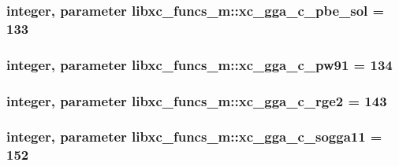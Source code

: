 \hypertarget{classlibxc__funcs__m_a44f75482ea324f5a50539ffdfb35b6f7}{
\subsubsection[{xc\-\_\-gga\-\_\-c\-\_\-pbe\-\_\-sol}]{\setlength{\rightskip}{0pt plus 5cm}integer, parameter libxc\-\_\-funcs\-\_\-m\-::xc\-\_\-gga\-\_\-c\-\_\-pbe\-\_\-sol = 133}}\label{classlibxc__funcs__m_a44f75482ea324f5a50539ffdfb35b6f7}
\hypertarget{classlibxc__funcs__m_af20bd6ced898ed4f4c011dad03298494}{
\subsubsection[{xc\-\_\-gga\-\_\-c\-\_\-pw91}]{\setlength{\rightskip}{0pt plus 5cm}integer, parameter libxc\-\_\-funcs\-\_\-m\-::xc\-\_\-gga\-\_\-c\-\_\-pw91 = 134}}\label{classlibxc__funcs__m_af20bd6ced898ed4f4c011dad03298494}
\hypertarget{classlibxc__funcs__m_abcb3cbd06df71def9e61bd0d466231d1}{
\subsubsection[{xc\-\_\-gga\-\_\-c\-\_\-rge2}]{\setlength{\rightskip}{0pt plus 5cm}integer, parameter libxc\-\_\-funcs\-\_\-m\-::xc\-\_\-gga\-\_\-c\-\_\-rge2 = 143}}\label{classlibxc__funcs__m_abcb3cbd06df71def9e61bd0d466231d1}
\hypertarget{classlibxc__funcs__m_a3bd4db90757fc2c20940b19d3680eee6}{
\subsubsection[{xc\-\_\-gga\-\_\-c\-\_\-sogga11}]{\setlength{\rightskip}{0pt plus 5cm}integer, parameter libxc\-\_\-funcs\-\_\-m\-::xc\-\_\-gga\-\_\-c\-\_\-sogga11 = 152}}\label{classlibxc__funcs__m_a3bd4db90757fc2c20940b19d3680eee6}
